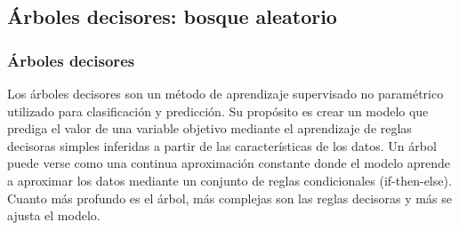 





\subsection{Árboles decisores: bosque aleatorio}
\subsubsection{Árboles decisores}


Los árboles decisores son un método de aprendizaje supervisado no paramétrico utilizado para clasificación y predicción.
Su propósito es crear un modelo que prediga el valor de una variable objetivo mediante el aprendizaje de reglas decisoras simples inferidas a partir de las características de los datos.
Un árbol puede verse como una continua aproximación constante donde el modelo aprende a aproximar los datos mediante un conjunto de reglas condicionales (if-then-else).
Cuanto más profundo es el árbol, más complejas son las reglas decisoras y más se ajusta el modelo.

